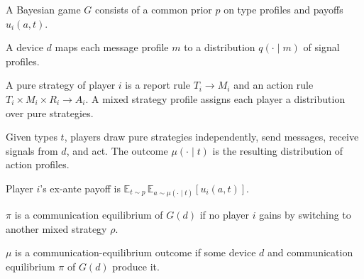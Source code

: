 \begin{definition}
  \label{def:bayes-game}
  \leanok
  A Bayesian game $G$ consists of a common prior $p$ on type profiles and
  payoffs $u_i(a, t)$.
\end{definition}

\begin{definition}
  \label{def:device}
  \leanok
  A device $d$ maps each message profile $m$ to a distribution $q(\cdot \mid m)$
  of signal profiles.
\end{definition}

\begin{definition}[Strategies]
  \label{def:strategies}
  \leanok
  A pure strategy of player $i$ is a report rule $T_i \to M_i$ and an action
  rule $T_i \times M_i \times R_i \to A_i$. A mixed strategy profile assigns
  each player a distribution over pure strategies.
\end{definition}

\begin{definition}
  \label{def:outcome}
  \leanok
  Given types $t$, players draw pure strategies independently, send messages,
  receive signals from $d$, and act. The outcome $\mu(\cdot \mid t)$ is the
  resulting distribution of action profiles.
\end{definition}

\begin{definition}[Payoff]
  \label{def:payoff}
  \leanok
  Player $i$'s ex-ante payoff is
  $\mathbb{E}_{t \sim p}\, \mathbb{E}_{a \sim \mu(\cdot \mid t)}[u_i(a, t)]$.
\end{definition}

\begin{definition}
  \label{def:comm-eq}
  \leanok
  $\pi$ is a communication equilibrium of $G(d)$ if no player $i$ gains by
  switching to another mixed strategy $\rho$.
\end{definition}

\begin{definition}
  \label{def:comm-eq-outcome}
  \leanok
  $\mu$ is a communication-equilibrium outcome if some device $d$ and
  communication equilibrium $\pi$ of $G(d)$ produce it.
\end{definition}

